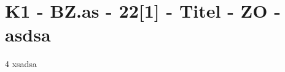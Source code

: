 \section{K1 - BZ.as - 22[1] - Titel - ZO - asdsa}

\begin{langesbeispiel}\item[4] %
xsadsa

\end{langesbeispiel}